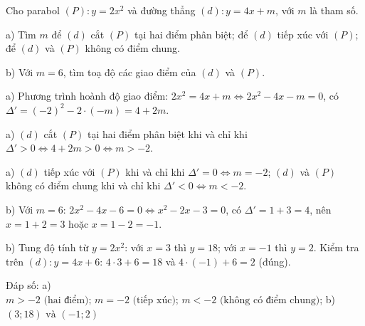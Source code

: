 \begin{problem}[9DS-HSB2-042]
Cho parabol $(P)\colon y = 2x^2$ và đường thẳng $(d)\colon y = 4x + m$, với $m$ là tham số.

a) Tìm $m$ để $(d)$ cắt $(P)$ tại hai điểm phân biệt; để $(d)$ tiếp xúc với $(P)$; để $(d)$ và $(P)$ không có điểm chung.

b) Với $m = 6$, tìm toạ độ các giao điểm của $(d)$ và $(P)$.

\begin{solution}
a) Phương trình hoành độ giao điểm: $2x^2 = 4x + m \Leftrightarrow 2x^2 - 4x - m = 0$, có $\Delta' = (-2)^2 - 2 \cdot (-m) = 4 + 2m$.

a) $(d)$ cắt $(P)$ tại hai điểm phân biệt khi và chỉ khi $\Delta' > 0 \Leftrightarrow 4 + 2m > 0 \Leftrightarrow m > -2$.

a) $(d)$ tiếp xúc với $(P)$ khi và chỉ khi $\Delta' = 0 \Leftrightarrow m = -2$; $(d)$ và $(P)$ không có điểm chung khi và chỉ khi $\Delta' < 0 \Leftrightarrow m < -2$.

b) Với $m = 6$: $2x^2 - 4x - 6 = 0 \Leftrightarrow x^2 - 2x - 3 = 0$, có $\Delta' = 1 + 3 = 4$, nên $x = 1 + 2 = 3$ hoặc $x = 1 - 2 = -1$.

b) Tung độ tính từ $y = 2x^2$: với $x = 3$ thì $y = 18$; với $x = -1$ thì $y = 2$. Kiểm tra trên $(d)\colon y = 4x + 6$: $4 \cdot 3 + 6 = 18$ và $4 \cdot (-1) + 6 = 2$ (đúng).

Đáp số: a) $\boxed{m > -2 \text{ (hai điểm); } m = -2 \text{ (tiếp xúc); } m < -2 \text{ (không có điểm chung)}}$; b) $\boxed{(3; 18) \text{ và } (-1; 2)}$
\end{solution}
\end{problem}

